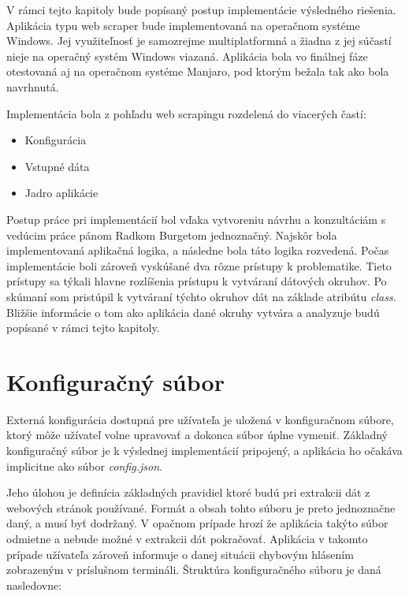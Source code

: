 V rámci tejto kapitoly bude popísaný postup implementácie výsledného riešenia. Aplikácia typu web scraper bude implementovaná na operačnom systéme Windows. Jej využiteľnosť je samozrejme multiplatformná a žiadna z jej súčastí nieje na operačný systém Windows viazaná. Aplikácia bola vo finálnej fáze otestovaná aj na operačnom systéme Manjaro, pod ktorým bežala tak ako bola navrhnutá.

Implementácia bola z pohľadu web scrapingu rozdelená do viacerých častí:

\begin{itemize}
    \item {Konfigurácia}
    \item {Vstupné dáta}
    \item {Jadro aplikácie}
\end{itemize}

\bigskip

Postup práce pri implementácií bol vďaka vytvoreniu návrhu a konzultáciám s vedúcim práce pánom Radkom Burgetom jednoznačný. Najskôr bola implementovaná aplikačná logika, a následne bola táto logika rozvedená. Počas implementácie boli zároveň vyskúšané dva rôzne prístupy k problematike. Tieto prístupy sa týkali hlavne rozlíšenia prístupu k vytváraní dátových okruhov. Po skúmaní som pristúpil k vytváraní týchto okruhov dát na základe atribútu \textit{class}. Bližšie informácie o tom ako aplikácia dané okruhy vytvára a analyzuje budú popísané v rámci tejto kapitoly.

\section{Konfiguračný súbor}

Externá konfigurácia dostupná pre užívateľa je uložená v konfiguračnom súbore, ktorý môže užívateľ volne upravovať a dokonca súbor úplne vymeniť. Základný konfiguračný súbor je k výslednej implementácií pripojený, a aplikácia ho očakáva implicitne ako súbor \textit{config.json}.

Jeho úlohou je definícia základných pravidiel ktoré budú pri extrakcii dát z webových stránok používané. Formát a obsah tohto súboru je preto jednoznačne daný, a musí byť dodržaný. V opačnom prípade hrozí že aplikácia takýto súbor odmietne a nebude možné v extrakcii dát pokračovať. Aplikácia v takomto prípade užívateľa zároveň informuje o danej situácii chybovým hlásením zobrazeným v príslušnom termináli. 
\newpage
Štruktúra konfiguračného súboru je daná nasledovne:

